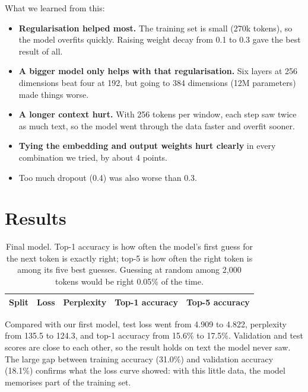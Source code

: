 \documentclass[11pt,a4paper]{article}
\begin{document}
\begin{table}[H]
\centering
\small
\caption{All 14 runs, sorted by validation top-1 accuracy. WD is weight decay; ``tied'' means the input embedding and output layer share weights. Run D was trained twice with identical results, which shows the setup is reproducible.}
\end{table}

What we learned from this:
\begin{itemize}
\item \textbf{Regularisation helped most.} The training set is small (270k tokens), so the model overfits quickly. Raising weight decay from 0.1 to 0.3 gave the best result of all.
\item \textbf{A bigger model only helps with that regularisation.} Six layers at 256 dimensions beat four at 192, but going to 384 dimensions (12M parameters) made things worse.
\item \textbf{A longer context hurt.} With 256 tokens per window, each step saw twice as much text, so the model went through the data faster and overfit sooner.
\item \textbf{Tying the embedding and output weights hurt clearly} in every combination we tried, by about 4 points.
\item Too much dropout (0.4) was also worse than 0.3.
\end{itemize}

\section{Results}

\begin{table}[H]
\centering
\begin{tabular}{lrrrr}
\toprule
Split & Loss & Perplexity & Top-1 accuracy & Top-5 accuracy \\
\midrule
\bottomrule
\end{tabular}
\caption{Final model. Top-1 accuracy is how often the model's first guess for the next token is exactly right; top-5 is how often the right token is among its five best guesses. Guessing at random among 2{,}000 tokens would be right 0.05\% of the time.}
\end{table}

Compared with our first model, test loss went from 4.909 to 4.822, perplexity from 135.5 to 124.3, and top-1 accuracy from 15.6\% to 17.5\%. Validation and test scores are close to each other, so the result holds on text the model never saw. The large gap between training accuracy (31.0\%) and validation accuracy (18.1\%) confirms what the loss curve showed: with this little data, the model memorises part of the training set.
\end{document}
